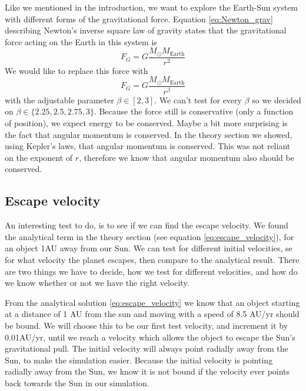 \documentclass[reprint, english,notitlepage,nofootinbib]{revtex4-1}  %
\begin{document}
Like we mentioned in the introduction, we want to explore the Earth-Sun system with different forms of the gravitational force. Equation \eqref{eq:Newton_grav} describing Newton's inverse square law of gravity states that the gravitational force acting on the Earth in this system is
\begin{equation*}
  F_G = G \frac{M_\odot M_{\text{Earth}}}{r^2}
\end{equation*}
We would like to replace this force with
\begin{equation}
  F_G = G \frac{M_\odot M_{\text{Earth}}}{r^\beta}
  \label{eq:Newton_grav_beta}
\end{equation}
with the adjustable parameter $\beta \in [2, 3]$. We can't test for every $\beta$ so we decided on $\beta \in \{2.25,2.5,2.75,3\}$. Because the force still is conservative (only a function of position), we expect energy to be conserved. Maybe a bit more surprising is the fact that angular momentum is conserved. In the theory section we showed, using Kepler's laws, that angular momentum is conserved. This was not reliant on the exponent of $r$, therefore we know that angular momentum also should be conserved.

\subsection{Escape velocity}

An interesting test to do, is to see if we can find the escape velocity. We found the analytical term in the theory section (see equation \eqref{eq:escape_velocity}), for an object 1AU away from our Sun. We can test for different initial velocities, se for what velocity the planet escapes, then compare to the analytical result. There are two things we have to decide, how we test for different velocities, and how do we know whether or not we have the right velocity.

From the analytical solution \eqref{eq:escape_velocity} we know that an object starting at a distance of 1 AU from the sun and moving with a speed of 8.5 AU/yr should be bound. We will choose this to be our first test velocity, and increment it by 0.01AU/yr, until we reach a velocity which allows the object to escape the Sun's gravitational pull. The initial velocity will always point radially away from the Sun, to make the simulation easier. Because the initial velocity is pointing radially away from the Sun, we know it is not bound if the velocity ever points back towards the Sun in our simulation.
\end{document}
